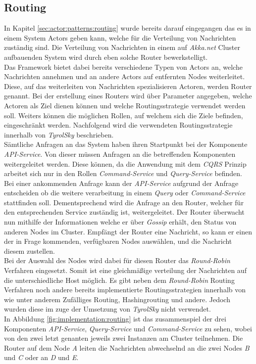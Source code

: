 \subsection{Routing}
\label{subsec:implementation:akkaRouting}
In Kapitel \ref{sec:actor:patterns:routing} wurde bereits darauf eingegangen das es in einem System Actors geben kann, welche für die Verteilung von Nachrichten zuständig sind. Die Verteilung von Nachrichten in einem auf \textit{Akka.net} Cluster aufbauenden System wird durch eben solche Router bewerkstelligt. \\
Das Framework bietet dabei bereits verschiedene Typen von Actors an, welche Nachrichten annehmen und an andere Actors auf entfernten Nodes weiterleitet. Diese, auf das weiterleiten von Nachrichten spezialisieren Actoren, werden Router genannt. Bei der erstellung eines Routers wird über Parameter angegeben, welche Actoren als Ziel dienen können und welche Routingsstrategie verwendet werden soll. Weiters können die möglichen Rollen, auf welchem sich die Ziele befinden, eingeschränkt werden. Nachfolgend wird die verwendeten Routingsstrategie innerhalb von \textit{TyrolSky} beschrieben. \\
Sämtliche Anfragen an das System haben ihren Startpunkt bei der Komponente \textit{API-Service}. Von dieser müssen Anfragen an die betreffenden Komponenten weitergeleitet werden. Diese können, da die Anwendung mit dem \textit{CQRS} Prinzip arbeitet sich nur in den Rollen \textit{Command-Service} und \textit{Query-Service} befinden. Bei einer ankommenden Anfrage kann der \textit{API-Service} aufgrund der Anfrage entscheiden ob die weitere verarbeitung in einem \textit{Query} oder \textit{Command-Service} stattfinden soll. Dementsprechend wird die Anfrage an den Router, welcher für den entsprechenden Service zuständig ist, weitergeleitet. Der Router überwacht nun mithilfe der Informationen welche er über \textit{Gossip} erhält, den Status von anderen Nodes im Cluster. Empfängt der Router eine Nachricht, so kann er einen der in Frage kommenden, verfügbaren Nodes auswählen, und die Nachricht diesem zustellen. \\
Bei der Auswahl des Nodes wird dabei für diesen Router das \textit{Round-Robin} Verfahren eingesetzt. Somit ist eine gleichmäßige verteilung der Nachrichten auf die unterschiedliche Host möglich. Es gibt neben dem \textit{Round-Robin} Routing Verfahren noch andere bereits implementierte Routingsstrategien innerhalb von  wie unter anderem Zufälliges Routing, Hashingrouting und andere. Jedoch wurden diese im zuge der Umsetzung von \textit{TyrolSky} nicht verwendet. \\
In Abbildung \ref{fig:implementation:routing} ist das zusammenspiel der drei Komponenten \textit{API-Service}, \textit{Query-Service} und \textit{Command-Service} zu sehen, wobei von den zwei letzt genanten jeweils zwei Instanzen am Cluster teilnehmen. Die Router auf dem Node \textit{A} leiten die Nachrichten abwechselnd an die zwei Nodes \textit{B} und \textit{C} oder an \textit{D} und \textit{E}. 

